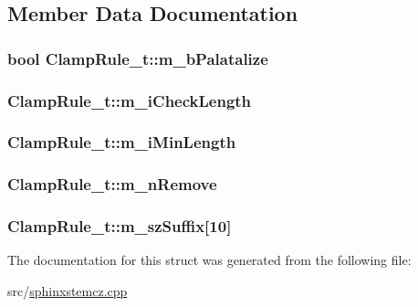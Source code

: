 \subsection{Member Data Documentation}
\hypertarget{structClampRule__t_a70d4aa610bcc938ca6adc611f60aeb21}{
\subsubsection[{m\-\_\-b\-Palatalize}]{\setlength{\rightskip}{0pt plus 5cm}bool Clamp\-Rule\-\_\-t\-::m\-\_\-b\-Palatalize}}\label{structClampRule__t_a70d4aa610bcc938ca6adc611f60aeb21}
\hypertarget{structClampRule__t_a8f8b01cdf669feab5fa313adf41fd449}{
\subsubsection[{m\-\_\-i\-Check\-Length}]{ Clamp\-Rule\-\_\-t\-::m\-\_\-i\-Check\-Length}}\label{structClampRule__t_a8f8b01cdf669feab5fa313adf41fd449}
\hypertarget{structClampRule__t_a58c285ecff2df05758277aef3e958eb3}{
\subsubsection[{m\-\_\-i\-Min\-Length}]{ Clamp\-Rule\-\_\-t\-::m\-\_\-i\-Min\-Length}}\label{structClampRule__t_a58c285ecff2df05758277aef3e958eb3}
\hypertarget{structClampRule__t_ad0e1a1374b12600cd690acb548f6232a}{
\subsubsection[{m\-\_\-n\-Remove}]{ Clamp\-Rule\-\_\-t\-::m\-\_\-n\-Remove}}\label{structClampRule__t_ad0e1a1374b12600cd690acb548f6232a}
\hypertarget{structClampRule__t_a7b8b30efd58765f643e2bcfba2d7eb0a}{
\subsubsection[{m\-\_\-sz\-Suffix}]{ Clamp\-Rule\-\_\-t\-::m\-\_\-sz\-Suffix\mbox{[}10\mbox{]}}}\label{structClampRule__t_a7b8b30efd58765f643e2bcfba2d7eb0a}


The documentation for this struct was generated from the following file\-:\begin{DoxyCompactItemize}
\item 
src/\hyperlink{sphinxstemcz_8cpp}{sphinxstemcz.\-cpp}\end{DoxyCompactItemize}
